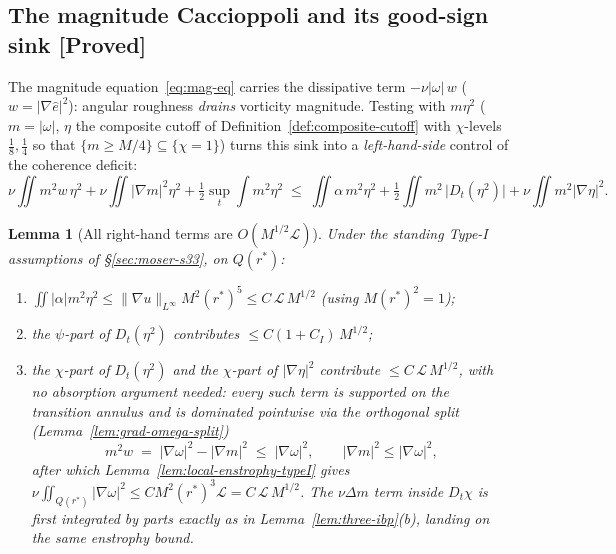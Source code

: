 \documentclass[11pt]{article}
\newtheorem{lemma}[theorem]{Lemma}
\theoremstyle{definition}
\theoremstyle{remark}
\begin{document}
\subsection{The magnitude Caccioppoli and its good-sign sink [Proved]}

The magnitude equation~\eqref{eq:mag-eq} carries the dissipative term
$-\nu|\omega|\,w$ ($w=|\nabla\hat{e}|^2$): angular roughness \emph{drains}
vorticity magnitude. Testing with $m\eta^2$ ($m=|\omega|$, $\eta$ the
composite cutoff of Definition~\ref{def:composite-cutoff} with $\chi$-levels
$\tfrac18,\tfrac14$ so that $\{m\geq M/4\}\subseteq\{\chi=1\}$) turns this
sink into a \emph{left-hand-side} control of the coherence deficit:
\begin{equation}\label{eq:mag-caccioppoli}
  \nu\iint m^2 w\,\eta^2
  + \nu\iint|\nabla m|^2\eta^2
  + \tfrac12\sup_t\int m^2\eta^2
  \;\leq\;
  \iint \alpha\,m^2\eta^2
  + \tfrac12\iint m^2\,\bigl|D_t(\eta^2)\bigr|
  + \nu\iint m^2|\nabla\eta|^2 .
\end{equation}

\begin{lemma}[All right-hand terms are $O(M^{1/2}\mathcal{L})$]
  \label{lem:mag-rhs}
  Under the standing Type-I assumptions of \S\ref{sec:moser-s33}, on
  $Q(r^*)$:
  \begin{enumerate}[label=(\alph*)]
    \item $\iint|\alpha|m^2\eta^2 \leq \|\nabla u\|_{L^\infty}M^2(r^*)^5
      \leq C\,\mathcal{L}\,M^{1/2}$ \quad (using $M(r^*)^2=1$);
    \item the $\psi$-part of $D_t(\eta^2)$ contributes
      $\leq C(1+C_I)\,M^{1/2}$;
    \item the $\chi$-part of $D_t(\eta^2)$ and the $\chi$-part of
      $|\nabla\eta|^2$ contribute $\leq C\,\mathcal{L}\,M^{1/2}$, with
      \emph{no absorption argument needed}: every such term is supported on
      the transition annulus and is dominated pointwise via the orthogonal
      split (Lemma~\ref{lem:grad-omega-split})
      \[
        m^2 w \;=\; |\nabla\omega|^2 - |\nabla m|^2 \;\leq\; |\nabla\omega|^2,
        \qquad |\nabla m|^2 \leq |\nabla\omega|^2,
      \]
      after which Lemma~\ref{lem:local-enstrophy-typeI} gives
      $\nu\iint_{Q(r^*)}|\nabla\omega|^2 \leq C M^2 (r^*)^3\mathcal{L}
      = C\,\mathcal{L}\,M^{1/2}$. The $\nu\Delta m$ term inside $D_t\chi$ is
      first integrated by parts exactly as in
      Lemma~\ref{lem:three-ibp}(b), landing on the same enstrophy bound.
  \end{enumerate}
\end{lemma}
\end{document}
